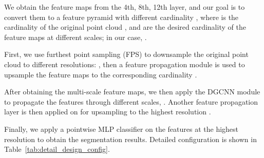 \documentclass[runningheads]{llncs}
\begin{document}
We obtain the feature maps  from the 4th, 8th, 12th layer, and our goal is to convert them to a feature pyramid with different cardinality , where  is the cardinality of the original point cloud , and  are the desired cardinality of the feature maps at different scales; in our case, .

First, we use furthest point sampling (FPS) to downsample the original point cloud  to different resolutions: , then a feature propagation module is used to upsample the feature maps  to the corresponding cardinality  .

After obtaining the multi-scale feature maps, we then apply the DGCNN module to propagate the features through different scales, .  Another feature propagation layer is then applied on  for upsampling to the highest resolution .

Finally, we apply a pointwise MLP classifier on the features at the highest resolution  to obtain the segmentation results.  Detailed configuration is shown in Table~\ref{tab:detail_design_config}.
\end{document}

